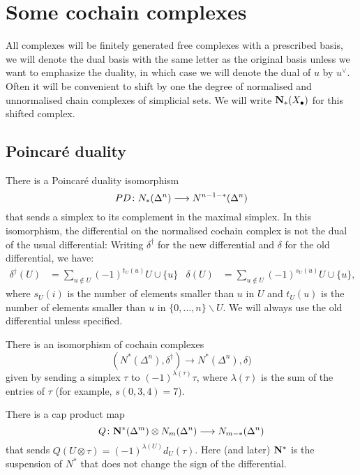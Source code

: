 
\section{Some cochain complexes}


All complexes will be finitely generated free complexes with a prescribed basis, we will denote the dual basis with the same letter as the original basis unless we want to emphasize the duality, in which case we will denote the dual of $u$ by $u^\vee$. Often it will be convenient to shift by one the degree of normalised and unnormalised chain complexes of simplicial sets. We will write $\mathbf{N}_*(X_\bullet)$ for this shifted complex. 

\subsection{Poincaré duality}
There is a Poincaré duality isomorphism
\[PD\colon N_*(\Delta^n)\longrightarrow N^{n-1-*}(\Delta^n)\]
that sends a simplex to its complement in the maximal simplex. In this isomorphism, the differential on the normalised cochain complex is not the dual of the usual differential: Writing $\delta^\dagger$ for the new differential and $\delta$ for the old differential, we have: 
\begin{align*}
    \delta^\dagger(U) &= \sum_{u\notin U} (-1)^{t_U(u)}U\cup \{u\}
    &
    \delta(U) &= \sum_{u\notin U}(-1)^{s_U(u)}U\cup \{u\},
\end{align*}
where $s_U(i)$ is the number of elements smaller than $u$ in $U$ and $t_U(u)$ is the number of elements smaller than $u$ in $\{0,\ldots,n\}\smallsetminus U$. We will always use the old differential unless specified.

There is an isomorphism of cochain complexes
\[(N^*(\Delta^n),\delta^\dagger)\longrightarrow N^*(\Delta^n),\delta)\]
given by sending a simplex $\tau$ to $(-1)^{\lambda(\tau)}\tau$, where $ \lambda(\tau)$ is the sum of the entries of $\tau$ (for example, $s(0,3,4) = 7$).

There is a cap product map
\[Q\colon \mathbf{N}^*(\Delta^m)\otimes N_m(\Delta^n)\longrightarrow N_{m-*}(\Delta^n)\]
that sends $Q(U\otimes \tau) = (-1)^{\lambda(U)}d_U(\tau)$. Here (and later) $\mathbf{N}^*$ is the suspension of $N^*$ that does not change the sign of the differential.

